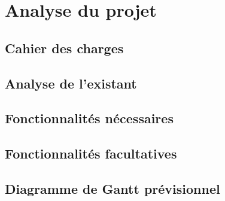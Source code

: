 \section{Analyse du projet} %
\subsection{Cahier des charges}

\subsection{Analyse de l'existant}

\subsection{Fonctionnalités nécessaires}

\subsection{Fonctionnalités facultatives}

\subsection{Diagramme de Gantt prévisionnel}
